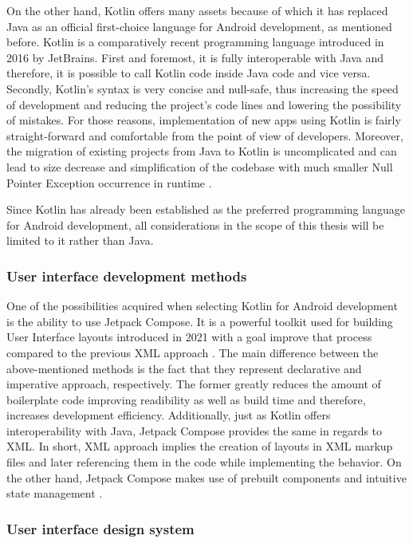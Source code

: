On the other hand, Kotlin offers many assets because of which it has replaced Java as an official first-choice language for Android development, as mentioned before. Kotlin is a comparatively recent programming language introduced in 2016 by JetBrains. First and foremost, it is fully interoperable with Java and therefore, it is possible to call Kotlin code inside Java code and vice versa. Secondly, Kotlin's syntax is very concise and null-safe, thus increasing the speed of development and reducing the project's code lines and lowering the possibility of mistakes. For those reasons, implementation of new apps using Kotlin is fairly straight-forward and comfortable from the point of view of developers. Moreover, the migration of existing projects from Java to Kotlin is uncomplicated and can lead to size decrease and simplification of the codebase with much smaller Null Pointer Exception occurrence in runtime \cite{android_kotlin_first}.

Since Kotlin has already been established as the preferred programming language for Android development, all considerations in the scope of this thesis will be limited to it rather than Java.

\subsubsection*{User interface development methods}

One of the possibilities acquired when selecting Kotlin for Android development is the ability to use Jetpack Compose. It is a powerful toolkit used for building User Interface layouts introduced in 2021 with a goal improve that process compared to the previous XML approach \cite{android_jetpack_compose}. 
The main difference between the above-mentioned methods is the fact that they represent declarative and imperative approach, respectively. The former greatly reduces the amount of boilerplate code improving readibility as well as build time and therefore, increases development efficiency. Additionally, just as Kotlin offers interoperability with Java, Jetpack Compose provides the same in regards to XML. In short, XML approach implies the creation of layouts in XML markup files and later referencing them in the code while implementing the behavior. On the other hand, Jetpack Compose makes use of prebuilt components and intuitive state management \cite{jetpack_compose_vs_xml}. 

\subsubsection*{User interface design system}

